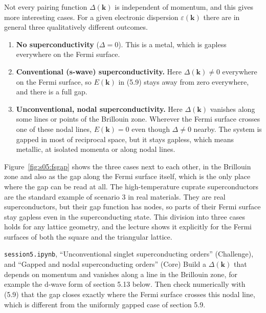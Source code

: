 Not every pairing function $\Delta(\mathbf k)$ is independent of momentum, and this gives more
interesting cases. For a given electronic dispersion $\varepsilon(\mathbf k)$ there are in general
three qualitatively different outcomes.

\begin{enumerate}
\item \textbf{No superconductivity} ($\Delta = 0$). This is a metal, which is gapless everywhere on
the Fermi surface.
\item \textbf{Conventional (s-wave) superconductivity.} Here $\Delta(\mathbf k) \ne 0$ everywhere on
the Fermi surface, so $E(\mathbf k)$ in (5.9) stays away from zero everywhere, and there is a full
gap.
\item \textbf{Unconventional, nodal superconductivity.} Here $\Delta(\mathbf k)$ vanishes along some
lines or points of the Brillouin zone. Wherever the Fermi surface crosses one of these nodal lines,
$E(\mathbf
k) = 0$ even though $\Delta \ne 0$ nearby. The system is gapped in most of reciprocal space, but it
stays gapless, which means metallic, at isolated momenta or along nodal lines.
\end{enumerate}



Figure~\ref{fig:s05:fsgap} shows the three cases next to each other, in the Brillouin zone and also
as the gap along the Fermi surface itself, which is the only place where the gap can be read at all.
The high-temperature cuprate superconductors are the standard example of scenario 3 in real
materials. They are real superconductors, but their gap function has nodes, so parts of their Fermi
surface stay gapless even in the superconducting state. This division into three cases holds for
any lattice geometry, and the lecture shows it explicitly for the Fermi surfaces of both the square
and the triangular lattice.

\begin{notebookbox}{\texttt{session5.ipynb}, ``Unconventional singlet superconducting orders'' (Challenge), and ``Gapped and nodal superconducting orders'' (Core)}
Build a $\Delta(\mathbf k)$ that depends on momentum and vanishes along a line in the Brillouin
zone, for example the d-wave form of section 5.13 below. Then check numerically with (5.9) that the
gap closes exactly where the Fermi surface crosses this nodal line, which is different from the
uniformly gapped case of section 5.9.
\end{notebookbox}

